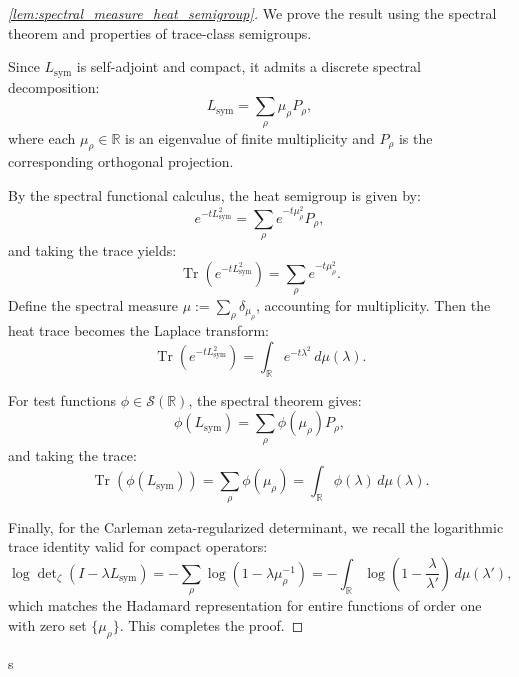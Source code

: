 \begin{proof}[\ref{lem:spectral_measure_heat_semigroup}]
We prove the result using the spectral theorem and properties of trace-class semigroups.

Since \( L_{\mathrm{sym}} \) is self-adjoint and compact, it admits a discrete spectral decomposition:
\[
L_{\mathrm{sym}} = \sum_{\rho} \mu_\rho P_\rho,
\]
where each \( \mu_\rho \in \mathbb{R} \) is an eigenvalue of finite multiplicity and \( P_\rho \) is the corresponding orthogonal projection.

By the spectral functional calculus, the heat semigroup is given by:
\[
e^{-tL_{\mathrm{sym}}^2} = \sum_{\rho} e^{-t\mu_\rho^2} P_\rho,
\]
and taking the trace yields:
\[
\operatorname{Tr}(e^{-tL_{\mathrm{sym}}^2}) = \sum_\rho e^{-t\mu_\rho^2}.
\]
Define the spectral measure \( \mu := \sum_{\rho} \delta_{\mu_\rho} \), accounting for multiplicity. Then the heat trace becomes the Laplace transform:
\[
\operatorname{Tr}(e^{-tL_{\mathrm{sym}}^2}) = \int_{\mathbb{R}} e^{-t\lambda^2} \, d\mu(\lambda).
\]

For test functions \( \phi \in \mathcal{S}(\mathbb{R}) \), the spectral theorem gives:
\[
\phi(L_{\mathrm{sym}}) = \sum_{\rho} \phi(\mu_\rho) P_\rho,
\]
and taking the trace:
\[
\operatorname{Tr}(\phi(L_{\mathrm{sym}})) = \sum_{\rho} \phi(\mu_\rho) = \int_{\mathbb{R}} \phi(\lambda) \, d\mu(\lambda).
\]

Finally, for the Carleman zeta-regularized determinant, we recall the logarithmic trace identity valid for compact operators:
\[
\log \det\nolimits_{\zeta}(I - \lambda L_{\mathrm{sym}}) = - \sum_\rho \log\left(1 - \lambda \mu_\rho^{-1} \right) = - \int_{\mathbb{R}} \log\left(1 - \frac{\lambda}{\lambda'} \right) \, d\mu(\lambda'),
\]
which matches the Hadamard representation for entire functions of order one with zero set \( \{\mu_\rho\} \). This completes the proof.
\end{proof}
s